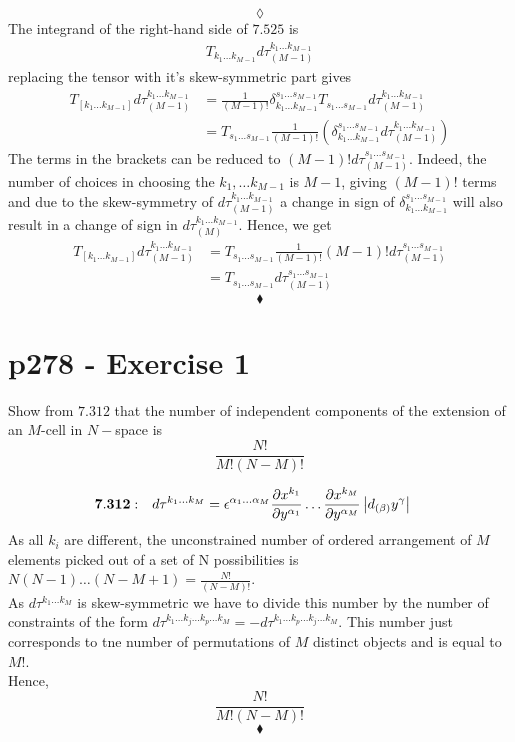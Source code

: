 $$\lozenge$$
The integrand of the right-hand side of $\mathbf{7.525}$ is
\begin{align}
T_{k_1\dots k_{M-1}}d\tau_{(M-1)}^{k_1\dots k_{M-1}}
\end{align}
replacing the tensor with it's skew-symmetric part gives
\begin{align}
T_{\left [k_1 \dots k_{M-1}\right ]}d\tau_{(M-1)}^{k_1\dots k_{M-1}}&= \frac{1}{\left(M-1\right)!}\delta_{k_1 \dots k_{M-1}}^{s_1 \dots s_{M-1}} T_{s_1\dots s_{M-1}}d\tau_{(M-1)}^{k_1\dots k_{M-1}}\\
&= T_{s_1\dots s_{M-1}}\frac{1}{\left(M-1\right)!} \left(\delta_{k_1 \dots k_{M-1}}^{s_1 \dots s_{M-1}}d\tau_{(M-1)}^{k_1\dots k_{M-1}}\right)
\end{align}
The terms in the brackets can be reduced to $\left(M-1\right)! d\tau_{(M-1)}^{s_1\dots s_{M-1}}$. Indeed, the number of choices in choosing the $k_1,\dots k_{M-1}$ is $M-1$, giving $\left(M-1\right)!$ terms  and due to the skew-symmetry of $d\tau_{(M-1)}^{k_1\dots k_{M-1}}$   a change in sign of $\delta_{k_1 \dots k_{M-1}}^{s_1 \dots s_{M-1}}$ will also result in a change of sign in $d\tau_{(M)}^{k_1\dots k_{M-1}}$.
Hence, we get 
\begin{align}
T_{\left [k_1 \dots k_{M-1}\right ]}d\tau_{(M-1)}^{k_1\dots k_{M-1}}&=T_{s_1\dots s_{M-1}}\frac{1}{\left(M-1\right)!}\left(M-1\right)! d\tau_{(M-1)}^{s_1\dots s_{M-1}}\\
&= T_{s_1\dots s_{M-1}} d\tau_{(M-1)}^{s_1\dots s_{M-1}}
\end{align}
$$\blacklozenge$$
\newpage


\section{p278 - Exercise 1 }
\begin{tcolorbox}
Show from $\mathbf{7.312}$ that the number of independent components of the extension of an $M$-cell in $N-$space is
$$\frac{N!}{M!\left(N-M\right)!}$$
\end{tcolorbox}
\begin{align}
\mathbf{7.312:}\quad d\tau^{k_1\dots k_M}&= \epsilon^{\alpha_1 \dots \alpha_M}\pdv{x^{k_1}}{y^{\alpha_1}}\dots \pdv{x^{k_M}}{y^{\alpha_M}}\left|d_{(\beta)}y^{\gamma}\right|
\end{align}
As all $k_i$ are different, the unconstrained number of ordered arrangement of $M$ elements picked out of a set of N possibilities is $N(N-1)\dots (N-M+1) = \frac{N!}{\left(N-M\right)!}$.\\
As $d\tau^{k_1\dots k_M}$ is skew-symmetric we have to divide this number by the number of constraints of the form $d\tau^{k_1\dots k_j \dots k_p \dots k_M} = -d\tau^{k_1\dots k_p \dots k_j \dots k_M}$. This number just corresponds to tne number of permutations of $M$ distinct objects and is equal to $M!$.\\
Hence,
$$\frac{N!}{M!\left(N-M\right)!}$$
$$\blacklozenge$$
\newpage


